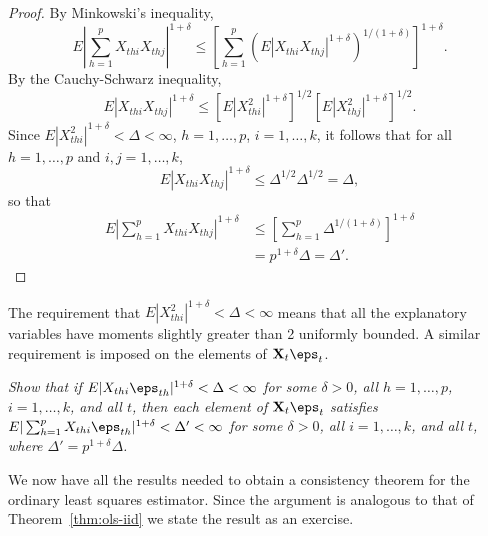 \begin{proof}
By Minkowski's inequality,
\[
E\left|\sum_{h=1}^{p} X_{thi} X_{thj}\right|^{1+\delta} \leq \left[\sum_{h=1}^{p} (E|X_{thi} X_{thj}|^{1+\delta})^{1/(1+\delta)}\right]^{1+\delta}.
\]
By the Cauchy-Schwarz inequality,
\[
E|X_{thi} X_{thj}|^{1+\delta} \leq [E|X_{thi}^2|^{1+\delta}]^{1/2} [E|X_{thj}^2|^{1+\delta}]^{1/2}.
\]
Since $E|X_{thi}^2|^{1+\delta} < \Delta < \infty$, $h = 1, \ldots, p$, $i = 1, \ldots, k$, it follows that for all $h = 1, \ldots, p$ and $i, j = 1, \ldots, k$,
\[
E|X_{thi} X_{thj}|^{1+\delta} \leq \Delta^{1/2} \Delta^{1/2} = \Delta,
\]
so that
\begin{align*}
E\left|\sum_{h=1}^{p} X_{thi} X_{thj}\right|^{1+\delta} &\leq \left[\sum_{h=1}^{p} \Delta^{1/(1+\delta)}\right]^{1+\delta} \\
&= p^{1+\delta} \Delta = \Delta'.
\end{align*}
\qedhere
\end{proof}

The requirement that $E|X_{thi}^2|^{1+\delta} < \Delta < \infty$ means that all the explanatory variables have moments slightly greater than 2 uniformly bounded. A similar requirement is imposed on the elements of $\mathbf{X}_t \eps_t$.

\begin{exercises}
\item\label{ex:moment-bound-xe} \emph{Show that if $E|X_{thi} \eps_{th}|^{1+\delta} < \Delta < \infty$ for some $\delta > 0$, all $h = 1, \ldots, p$, $i = 1, \ldots, k$, and all $t$, then each element of $\mathbf{X}_t \eps_t$ satisfies $E|\sum_{h=1}^{p} X_{thi} \eps_{th}|^{1+\delta} < \Delta' < \infty$ for some $\delta > 0$, all $i = 1, \ldots, k$, and all $t$, where $\Delta' = p^{1+\delta} \Delta$.}
\end{exercises}

We now have all the results needed to obtain a consistency theorem for the ordinary least squares estimator. Since the argument is analogous to that of Theorem~\ref{thm:ols-iid} we state the result as an exercise.


